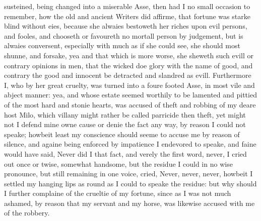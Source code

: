 susteined, being changed into a miserable Asse, then had I no small occasion to
remember, how the old and ancient Writers did affirme, that fortune was starke
blind without eies, because she alwaies bestoweth her riches upon evil persons,
and fooles, and chooseth or favoureth no mortall person by judgement, but is
alwaies conversent, especially with much as if she could see, she should most
shunne, and forsake, yea and that which is more worse, she sheweth such evill
or contrary opinions in men, that the wicked doe glory with the name of good,
and contrary the good and innocent be detracted and slandred as evill.
Furthermore I, who by her great cruelty, was turned into a foure footed Asse,
in most vile and abject manner: yea, and whose estate seemed worthily to be
lamented and pittied of the most hard and stonie hearts, was accused of theft
and robbing of my deare host Milo, which villany might rather be called
parricide then theft, yet might not I defend mine owne cause or denie the fact
any way, by reason I could not speake; howbeit least my conscience should seeme
to accuse me by reason of silence, and againe being enforced by impatience I
endevored to speake, and faine would have said, Never did I that fact, and
verely the first word, never, I cried out once or twise, somewhat handsome, but
the residue I could in no wise pronounce, but still remaining in one voice,
cried, Never, never, never, howbeit I settled my hanging lips as round as I
could to speake the residue: but why should I further complaine of the crueltie
of my fortune, since as I was not much ashamed, by reason that my servant and
my horse, was likewise accused with me of the robbery.

